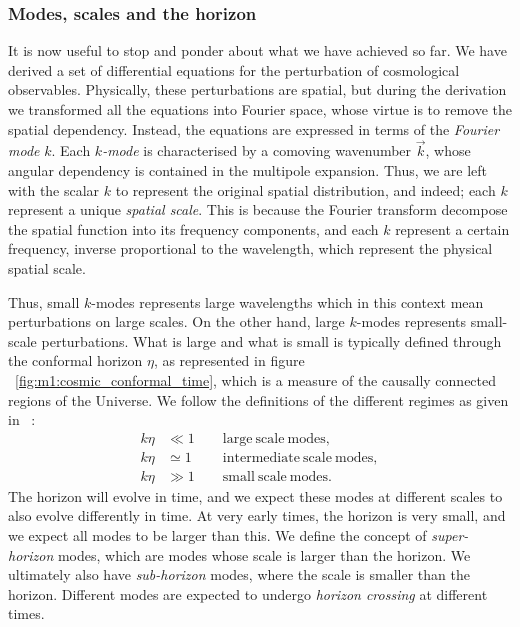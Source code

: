 \subsubsection{Modes, scales and the horizon}\label{sec:m3:theory:modes_scales_horizon}
    It is now useful to stop and ponder about what we have achieved so far. We have derived a set of differential equations for the perturbation of cosmological observables. Physically, these perturbations are spatial, but during the derivation we transformed all the equations into Fourier space, whose virtue is to remove the spatial dependency. Instead, the equations are expressed in terms of the \textit{Fourier mode} $k$. Each $k$\textit{-mode} is characterised by a comoving wavenumber $\vec{k}$, whose angular dependency is contained in the multipole expansion. Thus, we are left with the scalar $k$ to represent the original spatial distribution, and indeed; each $k$ represent a unique \textit{spatial scale}. This is because the Fourier transform decompose the spatial function into its frequency components, and each $k$ represent a certain frequency, inverse proportional to the wavelength, which represent the physical spatial scale. 

    Thus, small $k$-modes represents large wavelengths which in this context mean perturbations on large scales. On the other hand, large $k$-modes represents small-scale perturbations. What is large and what is small is typically defined through the conformal horizon $\eta$, as represented in figure ~\cref{fig:m1:cosmic_conformal_time}, which is a measure of the causally connected regions of the Universe. We follow the definitions of the different regimes as given in ~\cite{dodelson2020modern}:
    \begin{equation}\label{eq:m3:theory:mode_scale_definition}
        \begin{split}
            k\eta &\ll 1 \quad \quad \mathrm{large\ scale\ modes,} \\
            k\eta &\simeq 1 \quad \quad \mathrm{\ intermediate\ scale\ modes,}\\
            k\eta &\gg 1 \quad \quad \mathrm{small\ scale\ modes.}
        \end{split}
    \end{equation}
    The horizon will evolve in time, and we expect these modes at different scales to also evolve differently in time. At very early times, the horizon is very small, and we expect all modes to be larger than this. We define the concept of \textit{super-horizon} modes, which are modes whose scale is larger than the horizon. We ultimately also have \textit{sub-horizon} modes, where the scale is smaller than the horizon. Different modes are expected to undergo \textit{horizon crossing} at different times. 
    
